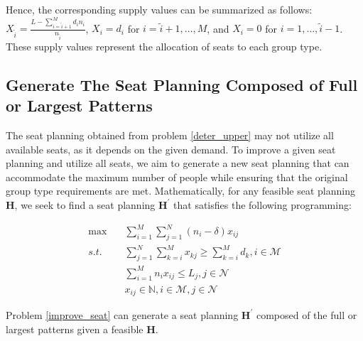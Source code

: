 Hence, the corresponding supply values can be summarized as follows: $X_{\tilde{i}} = \frac{L - \sum_{i = \tilde{i}+1}^{M} {d_i n_i}}{n_{\tilde{i}}}$, $X_{i} = d_{i}$ for $i = \tilde{i} +1,\ldots, M$, and $X_{i} = 0$ for $i = 1, \ldots, \tilde{i}-1$. These supply values represent the allocation of seats to each group type.

\subsection{Generate The Seat Planning Composed of Full or Largest Patterns}
The seat planning obtained from problem \eqref{deter_upper} may not utilize all available seats, as it depends on the given demand. To improve a given seat planning and utilize all seats, we aim to generate a new seat planning that can accommodate the maximum number of people while ensuring that the original group type requirements are met. Mathematically, for any feasible seat planning $\bm{H}$, we seek to find a seat planning $\bm{H}^{\prime}$ that satisfies the following programming:

\begin{equation}\label{improve_seat}
  \begin{aligned}
  \max \quad & \sum_{i=1}^{M} \sum_{j=1}^{N} (n_i-\delta)  x_{ij} \\
  s.t. \quad & \sum_{j=1}^{N} \sum_{k=i}^{M} x_{kj} \geq  \sum_{k=i}^{M} d_k, i \in \mathcal{M} \\
  & \sum_{i=1}^{M} n_{i} x_{ij} \leq L_{j}, j \in \mathcal{N} \\
  & x_{ij} \in \mathbb{N}, i \in \mathcal{M}, j \in \mathcal{N}
  \end{aligned}
\end{equation}

\begin{prop}\label{prop_construction}
  Problem \eqref{improve_seat} can generate a seat planning $\bm{H}^{\prime}$ composed of the full or largest patterns given a feasible $\bm{H}$.
\end{prop}


